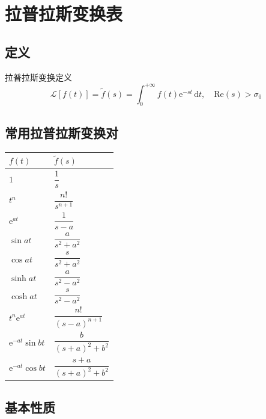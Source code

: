 
\chapter{拉普拉斯变换表}

\section{定义}
\begin{dingliyi}{拉普拉斯变换定义}{}
\[
    \mathcal{L}[f(t)] = \tilde{f}(s) = \int_0^{+\infty} f(t)\mathrm{e}^{-st}\,\mathrm{d}t, \quad \mathrm{Re}(s) > \sigma_0
\]
\end{dingliyi}

\section{常用拉普拉斯变换对}

\begin{table}[htbp]
\centering
\begin{tabular}{ll}
\toprule
$f(t)$ & $\tilde{f}(s)$ \\
\midrule
$1$ & $\dfrac{1}{s}$ \\[6pt]
$t^n$ & $\dfrac{n!}{s^{n+1}}$ \\[6pt]
$\mathrm{e}^{at}$ & $\dfrac{1}{s-a}$ \\[6pt]
$\sin at$ & $\dfrac{a}{s^2+a^2}$ \\[6pt]
$\cos at$ & $\dfrac{s}{s^2+a^2}$ \\[6pt]
$\sinh at$ & $\dfrac{a}{s^2-a^2}$ \\[6pt]
$\cosh at$ & $\dfrac{s}{s^2-a^2}$ \\[6pt]
$t^n\mathrm{e}^{at}$ & $\dfrac{n!}{(s-a)^{n+1}}$ \\[6pt]
$\mathrm{e}^{-at}\sin bt$ & $\dfrac{b}{(s+a)^2+b^2}$ \\[6pt]
$\mathrm{e}^{-at}\cos bt$ & $\dfrac{s+a}{(s+a)^2+b^2}$ \\[6pt]
\bottomrule
\end{tabular}
\end{table}

\section{基本性质}

